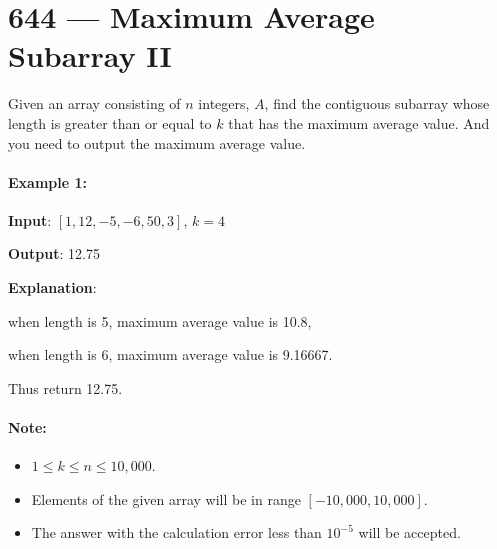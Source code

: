 \section{644 --- Maximum Average Subarray II}
Given an array consisting of $n$ integers, $A$, find the contiguous subarray whose length is greater than or equal to $k$ that has the maximum average value. And you need to output the maximum average value.

\paragraph{Example 1:}

\begin{flushleft}
\textbf{Input}: $[1,12,-5,-6,50,3]$, $k = 4$

\textbf{Output}: 12.75

\textbf{Explanation}:

when length is 5, maximum average value is 10.8,

when length is 6, maximum average value is 9.16667.

Thus return 12.75.
\end{flushleft}

\paragraph{Note:}

\begin{itemize}
\item $1 \leq k \leq n \leq 10,000$.
\item Elements of the given array will be in range $[-10,000, 10,000]$.
\item The answer with the calculation error less than $10^{-5}$ will be accepted.
\end{itemize}

